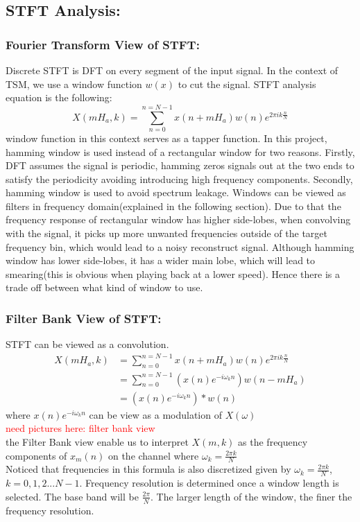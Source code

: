 \documentclass[11pt]{article}
\begin{document}
\subsection{STFT Analysis: }
\subsubsection{Fourier Transform View of STFT:}
Discrete STFT is DFT on every segment of the input signal. In the context of TSM, we use a window function $w(x)$ to cut the signal. STFT analysis equation is the following:
\begin{equation}
        X(mH_a,k) = \sum_{n=0}^{n= N-1} x(n+mH_a) w(n) e^{2 \pi ik \frac{n}{N}} 
\end{equation}
window function in this context serves as a tapper function. In this project, hamming window is used instead of a rectangular window for two reasons. Firstly, DFT assumes the signal is periodic, hamming zeros signals out at the two ends to satisfy the periodicity avoiding introducing high frequency components. Secondly, hamming window is used to avoid spectrum leakage. Windows can be viewed as filters in frequency domain(explained in the following section). Due to that the frequency response of rectangular window has higher side-lobes, when convolving with the signal, it picks up more unwanted frequencies outside of the target frequency bin, which would lead to a noisy reconstruct signal. Although hamming window has lower side-lobes, it has a wider main lobe, which will lead to smearing(this is obvious when playing back at a lower speed). Hence there is a trade off between what kind of window to use.
\subsubsection{Filter Bank View of STFT:}
STFT can be viewed as a convolution.\\ 
\[
        \begin{aligned}
        X(mH_a,k) &= \sum_{n=0}^{n= N-1} x(n+mH_a) w(n) e^{2 \pi ik \frac{n}{N}}\\ 
                  &=\sum_{n=0}^{n=N-1}(x(n)e^{-i\omega_k n})w(n-mH_a)\\
                  &=  (x(n) e^{-i\omega_k n} )* w(n)
\end{aligned}
\]
where  $x(n) e^{-i\omega_k n}$ can be view as a modulation of $X(\omega)$\\
\textcolor{red}{need pictures here: filter bank view}\\
the Filter Bank view enable us to interpret $X(m,k)$ as the frequency components of $x_m(n)$ on the channel where $\omega_k=\frac{2\pi k}{N}$ \\ 
Noticed that frequencies in this formula is also discretized given by $\omega_{k} = \frac{2\pi k}{N}$, $k=0,1,2...N-1$. Frequency resolution is determined once a window length is selected. The base band will be $\frac{2\pi}{N}$. The larger length of the window, the finer the frequency resolution. 
\end{document}
